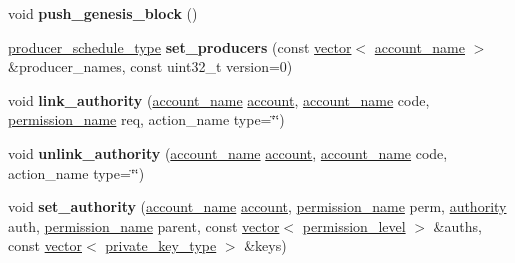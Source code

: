 \begin{DoxyCompactItemize}
void {\bfseries push\+\_\+genesis\+\_\+block} ()
\item 
\mbox{\label{classaacio_1_1testing_1_1base__tester_ab2db026803cdd2f938dc1de9728cd936}} 
\mbox{\hyperlink{structaacio_1_1chain_1_1producer__schedule__type}{producer\+\_\+schedule\+\_\+type}} {\bfseries set\+\_\+producers} (const \mbox{\hyperlink{classstd_1_1vector}{vector}}$<$ \mbox{\hyperlink{structaacio_1_1chain_1_1name}{account\+\_\+name}} $>$ \&producer\+\_\+names, const uint32\+\_\+t version=0)
\item 
\mbox{\label{classaacio_1_1testing_1_1base__tester_a9e919cd867104151b722e96e11763d35}} 
void {\bfseries link\+\_\+authority} (\mbox{\hyperlink{structaacio_1_1chain_1_1name}{account\+\_\+name}} \mbox{\hyperlink{structaccount}{account}}, \mbox{\hyperlink{structaacio_1_1chain_1_1name}{account\+\_\+name}} code, \mbox{\hyperlink{structaacio_1_1chain_1_1name}{permission\+\_\+name}} req, action\+\_\+name type=\char`\"{}\char`\"{})
\item 
\mbox{\label{classaacio_1_1testing_1_1base__tester_aa07e0e4da3f24b1643a9f4887f48c01e}} 
void {\bfseries unlink\+\_\+authority} (\mbox{\hyperlink{structaacio_1_1chain_1_1name}{account\+\_\+name}} \mbox{\hyperlink{structaccount}{account}}, \mbox{\hyperlink{structaacio_1_1chain_1_1name}{account\+\_\+name}} code, action\+\_\+name type=\char`\"{}\char`\"{})
\item 
\mbox{\label{classaacio_1_1testing_1_1base__tester_ae435394fd110476219e6418b4c9367b6}} 
void {\bfseries set\+\_\+authority} (\mbox{\hyperlink{structaacio_1_1chain_1_1name}{account\+\_\+name}} \mbox{\hyperlink{structaccount}{account}}, \mbox{\hyperlink{structaacio_1_1chain_1_1name}{permission\+\_\+name}} perm, \mbox{\hyperlink{structaacio_1_1chain_1_1authority}{authority}} auth, \mbox{\hyperlink{structaacio_1_1chain_1_1name}{permission\+\_\+name}} parent, const \mbox{\hyperlink{classstd_1_1vector}{vector}}$<$ \mbox{\hyperlink{structaacio_1_1chain_1_1permission__level}{permission\+\_\+level}} $>$ \&auths, const \mbox{\hyperlink{classstd_1_1vector}{vector}}$<$ \mbox{\hyperlink{classfc_1_1crypto_1_1private__key}{private\+\_\+key\+\_\+type}} $>$ \&keys)
\item 
\mbox{\label{classaacio_1_1testing_1_1base__tester_a21c25bc8bff06e8f0f2c008aefd889e5}} 

\end{DoxyCompactItemize}

